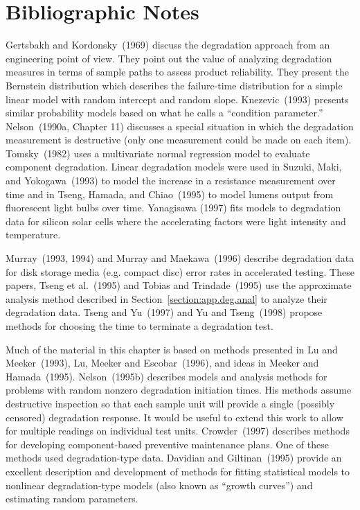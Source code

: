 \section*{Bibliographic Notes}
Gertsbakh and Kordonsky~(1969) discuss the degradation approach from
an engineering point of view.  They point out the value of analyzing
degradation measures in terms of sample paths to assess product
reliability.  They present the Bernstein distribution which
describes the failure-time distribution for a simple linear model
with random intercept and random slope.  Knezevic~(1993) presents
similar probability models based on what he calls a ``condition
parameter.''  Nelson~(1990a, Chapter 11) discusses a special
situation in which the degradation measurement is destructive (only
one measurement could be made on each item). Tomsky~(1982) uses a
multivariate normal regression model to evaluate component
degradation.  Linear degradation models were used in Suzuki, Maki,
and Yokogawa~(1993) to model the increase in a resistance
measurement over time and in Tseng, Hamada, and Chiao~(1995) to
model lumens output from fluorescent light bulbs over time.
Yanagisawa (1997) fits models to degradation data for silicon solar
cells where the accelerating factors were light intensity and
temperature.

Murray~(1993, 1994) and Murray and Maekawa~(1996) describe
degradation data for disk storage media (e.g. compact disc) error
rates in accelerated testing. These papers, Tseng et al.~(1995) and
Tobias and Trindade~(1995) use the approximate analysis method
described in Section~\ref{section:app.deg.anal} to analyze their
degradation data. Tseng and Yu~(1997) and Yu and Tseng~(1998)
propose methods for choosing the time to terminate a degradation
test.

Much of the material in this chapter is based on methods presented
in Lu and Meeker~(1993), Lu, Meeker and Escobar~(1996), and ideas in
Meeker and Hamada~(1995).  Nelson~(1995b) describes models and
analysis methods for problems with random nonzero degradation
initiation times.  His methods assume destructive inspection so that
each sample unit will provide a single (possibly censored)
degradation response. It would be useful to extend this work to
allow for multiple readings on individual test units.
Crowder~(1997) describes methods for developing component-based
preventive maintenance plans.  One of these methods used
degradation-type data. Davidian and Giltinan~(1995) provide an
excellent description and development of methods for fitting
statistical models to nonlinear degradation-type models (also known
as ``growth curves'') and estimating random parameters.

